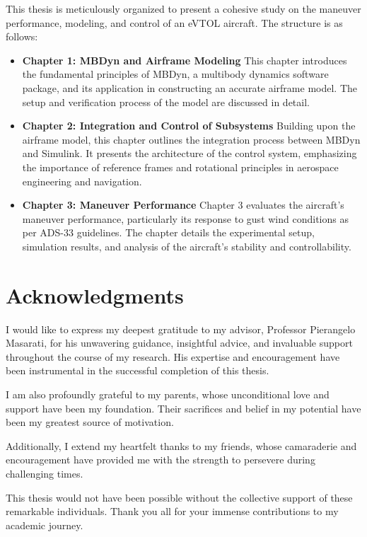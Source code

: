 \documentclass{Configuration_Files/PoliMi3i_thesis}
\begin{document}
This thesis is meticulously organized to present a cohesive study on the maneuver performance, modeling, and control of an eVTOL aircraft. The structure is as follows:

\begin{itemize}
    \item \textbf{Chapter 1: MBDyn and Airframe Modeling}
          This chapter introduces the fundamental principles of MBDyn, a multibody dynamics software package, and its application in constructing an accurate airframe model. The setup and verification process of the model are discussed in detail.

    \item \textbf{Chapter 2: Integration and Control of Subsystems}
          Building upon the airframe model, this chapter outlines the integration process between MBDyn and Simulink. It presents the architecture of the control system, emphasizing the importance of reference frames and rotational principles in aerospace engineering and navigation.

    \item \textbf{Chapter 3: Maneuver Performance}
          Chapter 3 evaluates the aircraft's maneuver performance, particularly its response to gust wind conditions as per ADS-33 guidelines. The chapter details the experimental setup, simulation results, and analysis of the aircraft's stability and controllability.
\end{itemize}











\chapter*{Acknowledgments}

I would like to express my deepest gratitude to my advisor, Professor Pierangelo Masarati, for his unwavering guidance, insightful advice, and invaluable support throughout the course of my research. His expertise and encouragement have been instrumental in the successful completion of this thesis.

I am also profoundly grateful to my parents, whose unconditional love and support have been my foundation. Their sacrifices and belief in my potential have been my greatest source of motivation.

Additionally, I extend my heartfelt thanks to my friends, whose camaraderie and encouragement have provided me with the strength to persevere during challenging times.

This thesis would not have been possible without the collective support of these remarkable individuals. Thank you all for your immense contributions to my academic journey.

\cleardoublepage
\end{document}

